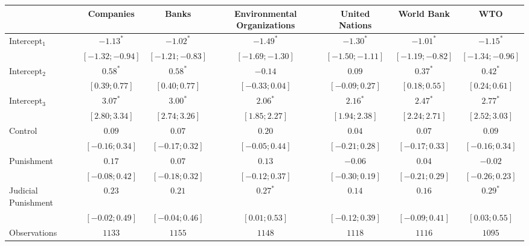 
\begin{table}[h]
\begin{center}
\begin{threeparttable}
\begin{tabular}{l c c c c c c}
\hline
 & Companies & Banks & Environmental Organizations & United Nations & World Bank & WTO \\
\hline
Intercept$_1$       & $-1.13^{*}$       & $-1.02^{*}$       & $-1.49^{*}$       & $-1.30^{*}$       & $-1.01^{*}$       & $-1.15^{*}$       \\
                    & $ [-1.32; -0.94]$ & $ [-1.21; -0.83]$ & $ [-1.69; -1.30]$ & $ [-1.50; -1.11]$ & $ [-1.19; -0.82]$ & $ [-1.34; -0.96]$ \\
Intercept$_2$       & $0.58^{*}$        & $0.58^{*}$        & $-0.14$           & $0.09$            & $0.37^{*}$        & $0.42^{*}$        \\
                    & $ [ 0.39;  0.77]$ & $ [ 0.40;  0.77]$ & $ [-0.33;  0.04]$ & $ [-0.09;  0.27]$ & $ [ 0.18;  0.55]$ & $ [ 0.24;  0.61]$ \\
Intercept$_3$       & $3.07^{*}$        & $3.00^{*}$        & $2.06^{*}$        & $2.16^{*}$        & $2.47^{*}$        & $2.77^{*}$        \\
                    & $ [ 2.80;  3.34]$ & $ [ 2.74;  3.26]$ & $ [ 1.85;  2.27]$ & $ [ 1.94;  2.38]$ & $ [ 2.24;  2.71]$ & $ [ 2.52;  3.03]$ \\
Control             & $0.09$            & $0.07$            & $0.20$            & $0.04$            & $0.07$            & $0.09$            \\
                    & $ [-0.16;  0.34]$ & $ [-0.17;  0.32]$ & $ [-0.05;  0.44]$ & $ [-0.21;  0.28]$ & $ [-0.17;  0.33]$ & $ [-0.16;  0.34]$ \\
Punishment          & $0.17$            & $0.07$            & $0.13$            & $-0.06$           & $0.04$            & $-0.02$           \\
                    & $ [-0.08;  0.42]$ & $ [-0.18;  0.32]$ & $ [-0.12;  0.37]$ & $ [-0.30;  0.19]$ & $ [-0.21;  0.29]$ & $ [-0.26;  0.23]$ \\
Judicial Punishment & $0.23$            & $0.21$            & $0.27^{*}$        & $0.14$            & $0.16$            & $0.29^{*}$        \\
                    & $ [-0.02;  0.49]$ & $ [-0.04;  0.46]$ & $ [ 0.01;  0.53]$ & $ [-0.12;  0.39]$ & $ [-0.09;  0.41]$ & $ [ 0.03;  0.55]$ \\
\hline
Observations        & $1133$            & $1155$            & $1148$            & $1118$            & $1116$            & $1095$            \\

\end{tabular}
\end{threeparttable}
\end{center}
\end{table}
